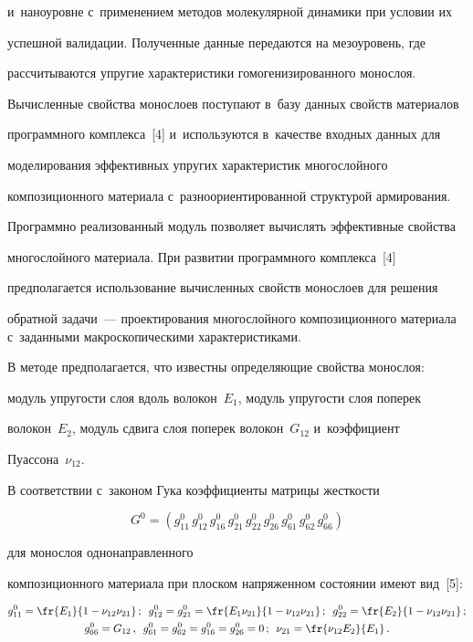 и~наноуровне с~применением методов молекулярной динамики при условии их 


успешной валидации. Полученные данные передаются на мезоуровень, где 


рассчитываются упругие характеристики гомогенизированного монослоя. 


Вычисленные свойства монослоев поступают в~базу данных свойств материалов 


программного комплекса~[4] и~используются в~качестве входных данных для 


моделирования эффективных упругих характеристик многослойного 


композиционного материала с~разноориентированной структурой армирования. 


Программно реализованный модуль позволяет вычислять эффективные свойства 


многослойного материала. При развитии программного комплекса~[4] 


предполагается использование вычисленных свойств монослоев для решения 


обратной задачи~--- проектирования многослойного композиционного материала с~заданными макроскопическими характеристиками.


     


     В методе предполагается, что известны определяющие свойства монослоя: 


модуль упругости слоя вдоль волокон~$E_1$, модуль упругости слоя поперек 


волокон~$E_2$, модуль сдвига слоя поперек волокон~$G_{12}$ и~коэффициент 


Пуассона~$\nu_{12}$. 


     


В соответствии с~законом Гука коэффициенты матрицы жест\-кости 


$$


G^0= \left(g_{11}^0\, g_{12}^0\, g_{16}^0\, g_{21}^0\, g_{22}^0\, g_{26}^0\, 


g_{61}^0\, g_{62}^0\, g_{66}^0\right)


$$ 


для монослоя однонаправленного 


композиционного материала при плоском напряженном состоянии имеют вид~[5]:


\begin{gather*}


g_{11}^0= \fr{E_1}{1-\nu_{12} \nu_{21}}\,;\enskip


g_{12}^0=g_{21}^0= \fr{E_1 \nu_{21}}{1-\nu_{12} \nu_{21}}\,;\enskip


g_{22}^0= \fr{E_2}{1-\nu_{12} \nu_{21}}\,;\\


g_{66}^0=G_{12}\,,\enskip


g_{61}^0=g_{62}^0=g_{16}^0=g_{26}^0 =0\,;\enskip 


\nu_{21}=\fr{\nu_{12}E_2}{E_1}\,.


\end{gather*}


